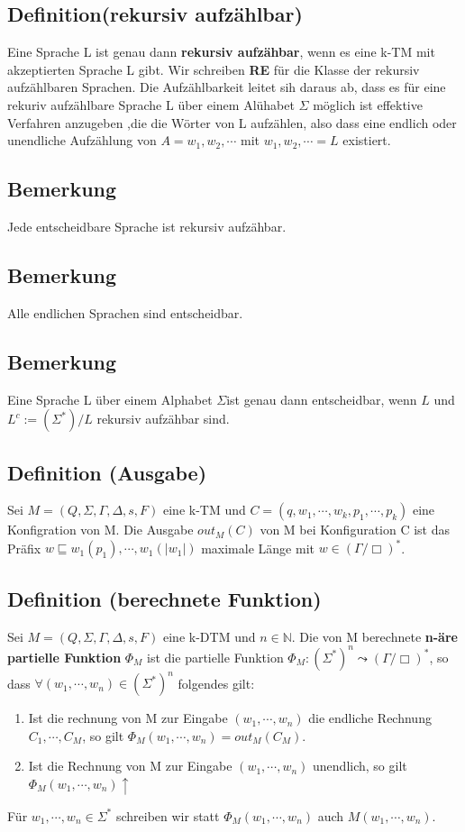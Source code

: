 \documentclass[a4paper,11pt]{article}
\begin{document}
\subsection{Definition(rekursiv aufzählbar)} Eine Sprache L ist genau dann \textbf{rekursiv aufzähbar}, wenn es eine k-TM mit akzeptierten Sprache L gibt. Wir schreiben \textbf{RE} für die Klasse der rekursiv aufzählbaren Sprachen. Die Aufzählbarkeit leitet sih daraus ab, dass es für eine rekuriv aufzählbare Sprache L über einem Alühabet $\Sigma$ möglich ist effektive Verfahren anzugeben ,die die Wörter von L aufzählen, also dass eine endlich oder unendliche Aufzählung von $A = w_1, w_2, \cdots$ mit ${w_1, w_2, \cdots} = L$ existiert.

\subsection{Bemerkung} Jede entscheidbare Sprache ist rekursiv aufzähbar.

\subsection{Bemerkung} Alle endlichen Sprachen sind entscheidbar.

\subsection{Bemerkung} Eine Sprache L über einem Alphabet $\Sigma$ist genau dann entscheidbar, wenn $L$ und $L^c :=(\Sigma^*)/L$ rekursiv aufzähbar sind.

\subsection{Definition (Ausgabe)} Sei $M = (Q, \Sigma, \Gamma, \Delta, s, F)$ eine k-TM und $C = (q, w_1, \cdots, w_k, p_1, \cdots, p_k)$ eine Konfigration von M. Die Ausgabe $out_M(C)$ von M bei Konfiguration C ist das Präfix $w \sqsubseteq w_1(p_1), \cdots, w_1(|w_1|)$ maximale Länge mit $w \in (\Gamma / {\Box})^*$.

\subsection{Definition (berechnete Funktion)} Sei $M = (Q, \Sigma, \Gamma, \Delta, s, F)$ eine k-DTM und $n \in \mathbb{N}$. Die von M berechnete \textbf{n-äre partielle Funktion} $\Phi_M$ ist die partielle Funktion $\Phi_M : (\Sigma^*)^n \leadsto (\Gamma / {\Box})^*$, so dass $\forall (w_1, \cdots, w_n) \in (\Sigma^*)^n$ folgendes gilt:
\begin{enumerate}
  \item Ist die rechnung von M zur Eingabe $(w_1, \cdots, w_n)$ die endliche Rechnung $C_1, \cdots, C_M$, so gilt $\Phi_M(w_1, \cdots, w_n) = out_M(C_M)$.
  \item Ist die Rechnung von M zur Eingabe $(w_1, \cdots, w_n)$ unendlich, so gilt $\Phi_M(w_1, \cdots, w_n)\uparrow $
\end{enumerate}
Für $w_1, \cdots, w_n \in \Sigma^*$ schreiben wir statt $\Phi_M(w_1, \cdots, w_n)$ auch $M(w_1, \cdots, w_n)$.
\end{document}
